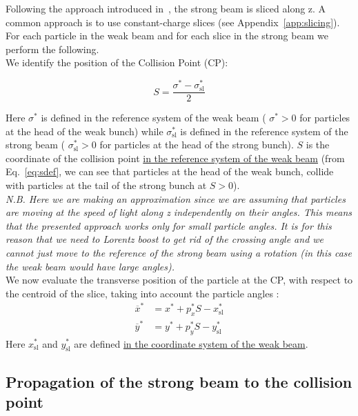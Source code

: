 Following the approach introduced in~\cite{hirata}, the strong beam is sliced along z. A common approach is to use constant-charge slices (see Appendix~\ref{app:slicing}). For each particle in the weak beam and for each slice in the strong beam we perform the following.
~\\

We identify the position of the Collision Point (CP):

\begin{equation}
S = \frac{\sigma^*-\sigma^*_\textrm{sl}}{2}
\label{eq:sdef}
\end{equation}

Here $\sigma^*$ is defined in the reference system of the weak beam ( $\sigma^*>0$ for particles at the head of the weak bunch) while $\sigma^*_\textrm{sl}$ is defined in the reference system of the strong beam ( $\sigma^*_\textrm{sl}>0$ for particles at the head of the strong bunch). $S$ is the coordinate of the collision point \underline{in the reference system of the weak beam} (from Eq.~\ref{eq:sdef}, we can see that particles at the head of the weak bunch, collide with particles at the tail of the strong bunch at $S>0$). 
~\\

\textit{N.B. Here we are making an approximation since we are assuming that particles are moving at the speed of light along z independently on their angles. This means that the presented approach works only for small particle angles. It is for this reason that we need to Lorentz boost to get rid of the crossing angle and we cannot just move to the reference of the strong beam using a rotation (in this case the weak beam would have large angles).}
~\\

We now evaluate the transverse position of the particle at the CP, with respect to the centroid of the slice, taking into account the particle angles :
\begin{align}
\overline{x}^* &= x^* + p^*_x S - x^*_\textrm{sl}\\
\overline{y}^* &= y^* + p^*_y S - y^*_\textrm{sl}
\end{align}
Here $x^*_\textrm{sl}$ and $y^*_\textrm{sl}$ are defined \underline{in the coordinate system of the weak beam}.
~\\

\subsection{Propagation of the strong beam to the collision point}

